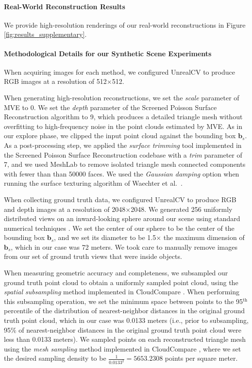 \vspace{-12pt}
\paragraph{Real-World Reconstruction Results}
We provide high-resolution renderings of our real-world reconstructions in Figure \ref{fig:results_supplementary}.

\vspace{-12pt}
\paragraph{Methodological Details for our Synthetic Scene Experiments}
When acquiring images for each method, we configured UnrealCV \cite{qiu:2016} to produce RGB images at a resolution of 512$\times$512.

When generating high-resolution reconstructions, we set the \emph{scale} parameter of MVE \cite{fuhrmann:2015} to 0.
We set the \emph{depth} parameter of the Screened Poisson Surface Reconstruction algorithm \cite{kazhdan:2013} to 9, which produces a detailed triangle mesh without overfitting to high-frequency noise in the point clouds estimated by MVE.
As in our explore phase, we clipped the input point cloud against the bounding box $\mathbf{b}_s$.
As a post-processing step, we applied the \emph{surface trimming} tool implemented in the Screened Poisson Surface Reconstruction codebase with a \emph{trim} parameter of 7, and we used MeshLab \cite{cignoni:2008} to remove isolated triangle mesh connected components with fewer than than 50000 faces.
We used the \emph{Gaussian damping} option when running the surface texturing algorithm of Waechter et al.~\cite{waechter:2014}.

When collecting ground truth data, we configured UnrealCV to produce RGB and depth images at a resolution of 2048$\times$2048.
We generated 256 uniformly distributed views on an inward-looking sphere around our scene using standard numerical techniques \cite{devert:2012}.
We set the center of our sphere to be the center of the bounding box $\mathbf{b}_s$, and we set its diameter to be 1.5$\times$ the maximum dimension of $\mathbf{b}_s$, which in our case was 72 meters.
We took care to manually remove images from our set of ground truth views that were inside objects.

When measuring geometric accuracy and completeness, we subsampled our ground truth point cloud to obtain a uniformly sampled point cloud, using the \emph{spatial subsampling} method implemented in CloudCompare \cite{cloudcompare:2017}.
When performing this subsampling operation, we set the minimum space between points to the 95$^{\text{th}}$ percentile of the distribution of nearest-neighbor distances in the original ground truth point cloud, which in our case was 0.0133 meters (i.e., prior to subsampling, 95\% of nearest-neighbor distances in the original ground truth point cloud were less than 0.0133 meters).
We sampled points on each reconstructed triangle mesh using the \emph{mesh sampling} method implemented in CloudCompare \cite{cloudcompare:2017}, where we set the desired sampling density to be $\frac{1}{0.0133^2} = 5653.2308$ points per square meter.

